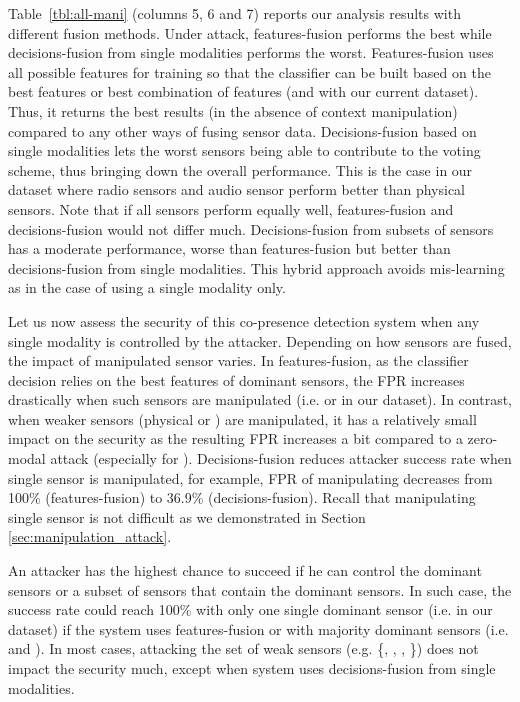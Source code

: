 Table~\ref{tbl:all-mani} (columns 5, 6 and 7) reports our analysis results with
different fusion methods. Under \zeromodal attack, features-fusion performs the
best while decisions-fusion from single modalities performs the worst.
Features-fusion uses all possible features for training so that the classifier
can be built based on the best features or best combination of features
(\bluetooth and \audio with our current dataset). Thus, it returns the
best results (in the absence of context manipulation) compared to any other
ways of fusing sensor data. Decisions-fusion based on single modalities lets
the worst sensors being able to contribute to the voting scheme, thus bringing
down the overall performance. This is the case in our dataset where radio
sensors and audio sensor perform better than physical sensors. Note that if all
sensors perform equally well, features-fusion and decisions-fusion would not
differ much. Decisions-fusion from subsets of sensors has a moderate
performance, worse than features-fusion but better than decisions-fusion from
single modalities.  This hybrid approach avoids mis-learning as in the case of
using a single modality only.

Let us now assess the security of this co-presence detection system when any
single modality is controlled by the attacker. Depending on how sensors are
fused, the impact of manipulated sensor varies. In features-fusion, as the
classifier decision relies on the best features of dominant sensors, the FPR
increases drastically when such sensors are manipulated (i.e. \audio or
{\bluetooth} in our dataset). In contrast, when weaker sensors (physical or
{\wifi}) are manipulated, it has a relatively small impact on the security as
the resulting FPR increases a bit compared to a zero-modal attack (especially
for \wifi). Decisions-fusion reduces attacker success rate when single sensor
is manipulated, for example, FPR of manipulating \bluetooth decreases from
100\% (features-fusion) to 36.9\% (decisions-fusion). 
Recall that manipulating single sensor is not difficult as we demonstrated in Section
\ref{sec:manipulation_attack}.

An attacker has the highest chance to succeed if he can control the dominant
sensors or a subset of sensors that contain the dominant sensors. In such case,
the success rate could reach 100\% with only one single dominant sensor (i.e.
\bluetooth in our dataset) if the system uses features-fusion or with
majority dominant sensors (i.e. \audio and \bluetooth). In most cases,
attacking the set of weak sensors (e.g. \{\altitude, \gas, \humidity,
\temperature{}\}) does not impact the security much, except when system uses
decisions-fusion from single modalities.






